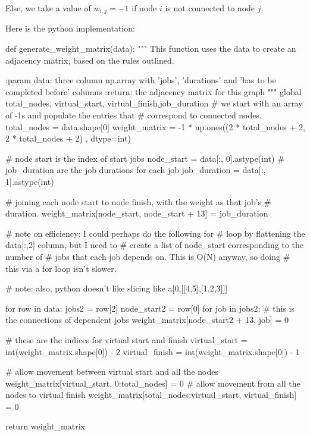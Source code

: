 \documentclass[paper=a4, fontsize=12pt]{scrartcl} %
\numberwithin{equation}{section}       %
\numberwithin{figure}{section}         %
\numberwithin{table}{section}          %
\begin{document}
Else, we take a value of $w_{i,j} = -1$ if node $i$ is not connected to node $j$. 

Here is the python implementation:

\begin{python}
def generate_weight_matrix(data):
    """
    This function uses the data to create an adjacency matrix, based
    on the rules outlined.

    :param data: three column np.array with 'jobs', 'durations'
    and 'has to be completed before' columns
    :return: the adjacency matrix for this graph
    """
    global total_nodes, virtual_start, virtual_finish,job_duration
    # we start with an array of -1s and populate the entries that
    # correspond to connected nodes.
    total_nodes = data.shape[0]
    weight_matrix = -1 * np.ones((2 * total_nodes + 2, 2 * total_nodes + 2)
                                 , dtype=int)

    # node start is the index of start jobs
    node_start = data[:, 0].astype(int)
    # job_duration are the job durations for each job
    job_duration = data[:, 1].astype(int)

    # joining each node start to node finish, with the weight as that job's
    # duration.
    weight_matrix[node_start, node_start + 13] = job_duration

    # note on efficiency: I could perhaps do the following for
    # loop by flattening the data[:,2] column, but I need to
    # create a list of node_start corresponding to the number of
    # jobs that each job depends on. This is O(N) anyway, so doing
    # this via a for loop isn't slower.

    # note: also, python doesn't like slicing like a[0,[[4,5],[1,2,3]]]

    for row in data:
        jobs2 = row[2]
        node_start2 = row[0]
        for job in jobs2:
            # this is the connections of dependent jobs
            weight_matrix[node_start2 + 13, job] = 0

    # these are the indices for virtual start and finish
    virtual_start = int(weight_matrix.shape[0]) - 2
    virtual_finish = int(weight_matrix.shape[0]) - 1

    # allow movement between virtual start and all the nodes
    weight_matrix[virtual_start, 0:total_nodes] = 0
    # allow movement from all the nodes to virtual finish
    weight_matrix[total_nodes:virtual_start, virtual_finish] = 0

    return weight_matrix
\end{python}
\end{document}

